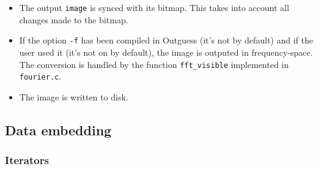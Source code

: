 \documentclass{article}
\begin{document}
\begin{itemize}
		The value returned by \texttt{preserve} in this case corresponds to the index of the bit that was changed to preserve the statistics, if any. If no bit was changed, a negative or null value is returned \footnote{If the modified offset was $0$, it wouldn't be counted in the foiling statistics. This is a bug.}. The \texttt{steg\_offset} array is only used to display the mean/standard deviation of the distance of changed bits to foil statistics \footnote{The final call to \texttt{preserve} will also try to modify some bits to preserve the distribution of DCT coefficients that failed to be preserved in previous calls. But these final modifications don't be taken into account in the displayed statistics. This is a bug.}.

		Finally, the statistical foiling logic is notified that the image finished being processed by calling the \texttt{preserve} function passing an offset greater or equal to the number of bits:
		\begin{verbatim}
      /* Indicates that we are done with the image */
      bitmap.preserve(&bitmap, bitmap.bits);
		\end{verbatim}
	
		During this entire process, the global variables are used to count the numbers of successful foils (\texttt{steg\_foil}) and unsucessful foils (\texttt{steg\_foilfail}). These variables are modified in handler-specific code. They are only used for informational purpose.
	
	\item The output \texttt{image} is synced with its bitmap. This takes into account all changes made to the bitmap.
	
	\item If the option \texttt{-f} has been compiled in Outguess (it's not by default) and if the user used it (it's not on by default), the image is outputed in frequency-space. The conversion is handled by the function \texttt{fft\_visible} implemented in \texttt{fourier.c}.
	
	\item The image is written to disk.
	
		
\end{itemize}

\subsection{Data embedding}

\subsubsection{Iterators}
\end{document}
